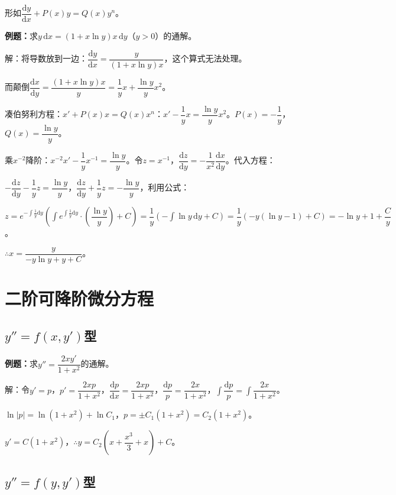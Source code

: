 \documentclass[UTF8, 12pt]{ctexart}
\begin{document}
形如$\dfrac{\textrm{d}y}{\textrm{d}x}+P(x)y=Q(x)y^n$。

\textbf{例题：}求$y\,\textrm{d}x=(1+x\ln y)x\,\textrm{d}y$（$y>0$）的通解。

解：将导数放到一边：$\dfrac{\textrm{d}y}{\textrm{d}x}=\dfrac{y}{(1+x\ln y)x}$，这个算式无法处理。

而颠倒$\dfrac{\textrm{d}x}{\textrm{d}y}=\dfrac{(1+x\ln y)x}{y}=\dfrac{1}{y}x+\dfrac{\ln y}{y}x^2$。

凑伯努利方程：$x'+P(x)x=Q(x)x^n$：$x'-\dfrac{1}{y}x=\dfrac{\ln y}{y}x^2$。$P(x)=-\dfrac{1}{y}$，$Q(x)=\dfrac{\ln y}{y}$。

乘$x^{-2}$降阶：$x^{-2}x'-\dfrac{1}{y}x^{-1}=\dfrac{\ln y}{y}$。令$z=x^{-1}$，$\dfrac{\textrm{d}z}{\textrm{d}y}=-\dfrac{1}{x^2}\dfrac{\textrm{d}x}{\textrm{d}y}$。代入方程：

$-\dfrac{\textrm{d}z}{\textrm{d}y}-\dfrac{1}{y}z=\dfrac{\ln y}{y}$，$\dfrac{\textrm{d}z}{\textrm{d}y}+\dfrac{1}{y}z=-\dfrac{\ln y}{y}$，利用公式：

$z=e^{-\int\frac{1}{y}\textrm{d}y}\left(\displaystyle{\int e^{\int\frac{1}{y}\textrm{d}y}\cdot\left(\dfrac{\ln y}{y}\right)+C}\right)=\dfrac{1}{y}(-\int\ln y\,\textrm{d}y+C)=\dfrac{1}{y}(-y(\ln y-1)+C)=-\ln y+1+\dfrac{C}{y}$。

$\therefore x=\dfrac{y}{-y\ln y+y+C}$。

\section{二阶可降阶微分方程}

\subsection{\texorpdfstring{$y''=f(x,y')$}\ 型}

\textbf{例题：}求$y''=\dfrac{2xy'}{1+x^2}$的通解。

解：令$y'=p$，$p'=\dfrac{2xp}{1+x^2}$，$\dfrac{\textrm{d}p}{\textrm{d}x}=\dfrac{2xp}{1+x^2}$，$\dfrac{\textrm{d}p}{p}=\dfrac{2x}{1+x^2}$，$\displaystyle{\int\dfrac{\textrm{d}p}{p}=\int\dfrac{2x}{1+x^2}}$。

$\ln\vert p\vert=\ln(1+x^2)+\ln C_1$，$p=\pm C_1(1+x^2)=C_2(1+x^2)$。

$y'=C(1+x^2)$，$\therefore y=C_2\left(x+\dfrac{x^3}{3}+x\right)+C$。

\subsection{\texorpdfstring{$y''=f(y,y')$}\ 型}
\end{document}
